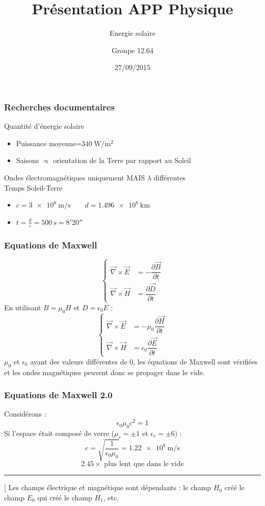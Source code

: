 \documentclass{beamer}
\begin{document}
\title[Présentation]{Présentation APP Physique}

\subtitle[\ldots]{Energie solaire}
\author{Groupe 12.64}
\date{27/09/2015}
\maketitle

\begin{frame}
\frametitle{Recherches documentaires}
Quantité d'énergie solaire 
	\begin{itemize}
	\item Puissance moyenne=$\SI{340}{\watt\per\meter^2}$
	\item Saisons $\propto$ orientation de la Terre par rapport au Soleil \\[1cm]
	\end{itemize}
Ondes électromagnétiques uniquement MAIS $\lambda$ différentes
\\[1cm]
Temps Soleil-Terre \begin{itemize}
	\item $c=\SI{3e8}{\meter\per\second} \qquad d=\SI{1.496e8}{\kilo\meter}$
	\item $t=\frac{d}{c}=\SI{500}{\second}=8'20''$
	\end{itemize}
\end{frame} 

\begin{frame}
	\frametitle{Equations de Maxwell}
	$$\begin{cases}
			\vec{\nabla} \times \vec{E} &= - \dfrac{\partial{\vec{B}}}{\partial{t}} \\
			\vec{\nabla} \times \vec{H} &= \dfrac{\partial{\vec{D}}}{\partial{t}}
		\end{cases}$$
	En utilisant $B = \mu_0H$ et $D = \epsilon_0E$ :
	$$\begin{cases}
			\vec{\nabla} \times \vec{E} &= - \mu_0\dfrac{\partial{\vec{H}}}{\partial{t}} \\
			\vec{\nabla} \times \vec{H} &= \epsilon_0\dfrac{\partial{\vec{E}}}{\partial{t}}
		\end{cases}$$
		$\mu_0$ et $\epsilon_0$ ayant des valeurs différentes de $0$, les équations de Maxwell sont vérifiées et les ondes magnétiques peuvent donc se propager dans le vide.
\end{frame}

\begin{frame}
	\frametitle{Equations de Maxwell 2.0}
	Considérons : 
	$$\epsilon_0 \mu_0 c^2 = 1$$
	Si l'espace était composé de verre ($\mu_r = \pm1$ et $\epsilon_r = \pm6$) : 
	$$ c = \sqrt{\frac{1}{\epsilon_0 \mu_0}} = \SI{1.22e8}{\meter\per\second} $$
	$$ 2.45\times\text{ plus lent que dans le vide}$$
	\hrule
	\phantom[
	Les champs électrique et magnétique sont dépendants : le champ $H_0$ créé le champ $E_0$ qui créé le champ $H_1$, etc.
\end{frame}
\end{document}
